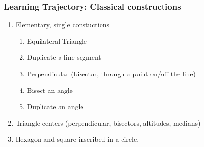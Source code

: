 

\fancyhead[LE]{\thepage}



\subsubsection*{Learning Trajectory: Classical constructions}
\begin{enumerate}
  \item Elementary, single constuctions
  \begin{enumerate}
    \item Equilateral Triangle
    \item Duplicate a line segment
    \item Perpendicular (bisector, through a point on/off the line)
    \item Bisect an angle
    \item Duplicate an angle
    \end{enumerate}
  \item Triangle centers (perpendicular, bisectors, altitudes, medians)
  \item Hexagon and square inscribed in a circle.
  \end{enumerate}

